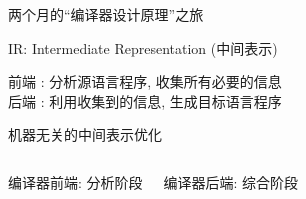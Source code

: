 \begin{frame}{}
  \begin{center}
    {\large 两个月的``编译器设计原理''之旅}

  \end{center}
\end{frame}


\begin{frame}{}
  \begin{center}
    IR: Intermediate Representation (中间表示)
    \vspace{0.50cm}


    \vspace{0.50cm}
    前端 : 分析源语言程序, 收集所有必要的信息 \\[8pt]
    后端 : 利用收集到的信息, 生成目标语言程序
  \end{center}
\end{frame}

\begin{frame}{}
  \begin{center}

    \vspace{0.50cm}
    机器无关的中间表示优化
  \end{center}
\end{frame}

\begin{frame}{}
  \begin{columns}
      \begin{center}
        编译器前端: 分析阶段

      \end{center}
      \begin{center}
        编译器后端: 综合阶段

      \end{center}
  \end{columns}

  \pause
\end{frame}

